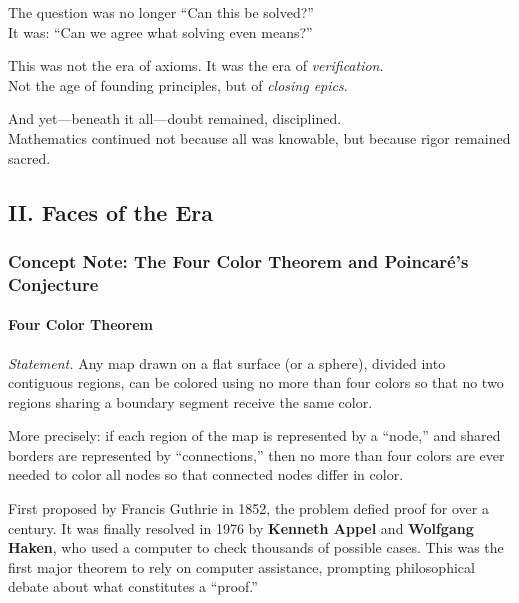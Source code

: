 \documentclass[9pt]{article}
\begin{document}
The question was no longer ``Can this be solved?'' \\
It was: ``Can we agree what solving even means?''

\medskip

This was not the era of axioms. It was the era of \textit{verification}. \\
Not the age of founding principles, but of \textit{closing epics}.

\medskip

And yet---beneath it all---doubt remained, disciplined. \\
Mathematics continued not because all was knowable, but because rigor remained sacred.

\newpage

\subsection*{II. Faces of the Era}

\subsubsection*{Concept Note: The Four Color Theorem and Poincaré's Conjecture}

\paragraph{Four Color Theorem}
\textit{Statement.} Any map drawn on a flat surface (or a sphere), divided into contiguous regions, can be colored using no more than four colors so that no two regions sharing a boundary segment receive the same color.

\medskip

\noindent More precisely: if each region of the map is represented by a ``node,'' and shared borders are represented by ``connections,'' then no more than four colors are ever needed to color all nodes so that connected nodes differ in color.

\medskip

\noindent First proposed by Francis Guthrie in 1852, the problem defied proof for over a century. It was finally resolved in 1976 by \textbf{Kenneth Appel} and \textbf{Wolfgang Haken}, who used a computer to check thousands of possible cases. This was the first major theorem to rely on computer assistance, prompting philosophical debate about what constitutes a ``proof.''

\medskip
\end{document}
